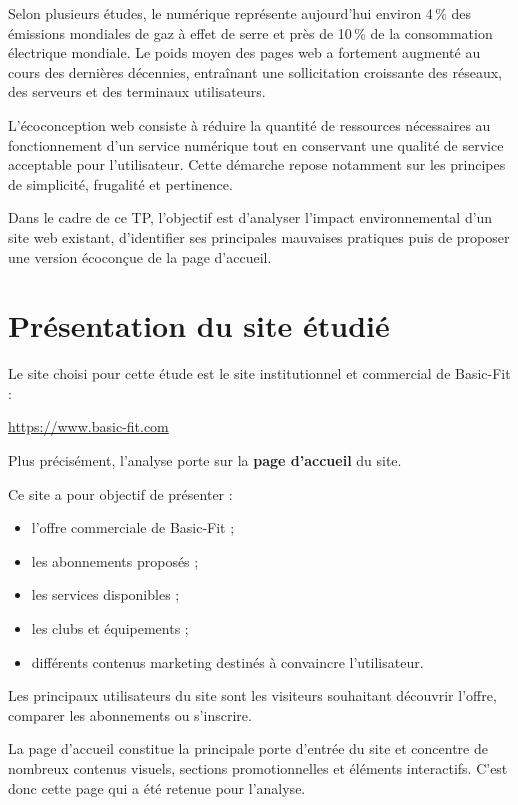 \documentclass[11pt,a4paper]{article}
\begin{document}
Selon plusieurs études, le numérique représente aujourd'hui environ 4\,\% des émissions mondiales de gaz à effet de serre et près de 10\,\% de la consommation électrique mondiale. Le poids moyen des pages web a fortement augmenté au cours des dernières décennies, entraînant une sollicitation croissante des réseaux, des serveurs et des terminaux utilisateurs.

L'écoconception web consiste à réduire la quantité de ressources nécessaires au fonctionnement d'un service numérique tout en conservant une qualité de service acceptable pour l'utilisateur. Cette démarche repose notamment sur les principes de simplicité, frugalité et pertinence.

Dans le cadre de ce TP, l'objectif est d'analyser l'impact environnemental d'un site web existant, d'identifier ses principales mauvaises pratiques puis de proposer une version écoconçue de la page d'accueil.

\section{Présentation du site étudié}

Le site choisi pour cette étude est le site institutionnel et commercial de Basic-Fit :

\begin{center}
\url{https://www.basic-fit.com}
\end{center}

Plus précisément, l'analyse porte sur la \textbf{page d'accueil} du site.

Ce site a pour objectif de présenter :
\begin{itemize}
\item l'offre commerciale de Basic-Fit ;
\item les abonnements proposés ;
\item les services disponibles ;
\item les clubs et équipements ;
\item différents contenus marketing destinés à convaincre l'utilisateur.
\end{itemize}

Les principaux utilisateurs du site sont les visiteurs souhaitant découvrir l'offre, comparer les abonnements ou s'inscrire.

La page d'accueil constitue la principale porte d'entrée du site et concentre de nombreux contenus visuels, sections promotionnelles et éléments interactifs. C'est donc cette page qui a été retenue pour l'analyse.
\end{document}
